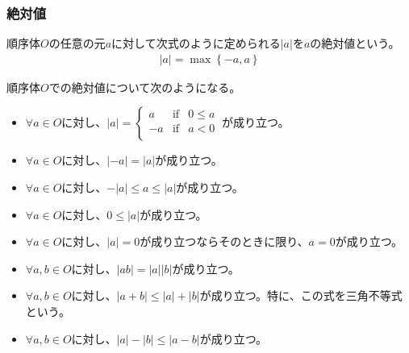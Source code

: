 \documentclass[dvipdfmx]{jsarticle}
\begin{document}
\subsubsection{絶対値}%
\begin{dfn}
順序体$O$の任意の元$a$に対して次式のように定められる$|a|$を$a$の絶対値という。
\begin{align*}
|a| = \max\left\{ - a,a \right\}
\end{align*}
\end{dfn}
\begin{thm}\label{4.1.1.10} 順序体$O$での絶対値について次のようになる。
\begin{itemize}
\item
  $\forall a \in O$に対し、$|a| = \left\{ \begin{matrix}
  a & \mathrm{if} & 0 \leq a \\
   - a & \mathrm{if} & a < 0 \\
  \end{matrix} \right.\ $が成り立つ。
\item
  $\forall a \in O$に対し、$| - a| = |a|$が成り立つ。
\item
  $\forall a \in O$に対し、$- |a| \leq a \leq |a|$が成り立つ。
\item
  $\forall a \in O$に対し、$0 \leq |a|$が成り立つ。
\item
  $\forall a \in O$に対し、$|a| = 0$が成り立つならそのときに限り、$a = 0$が成り立つ。
\item
  $\forall a,b \in O$に対し、$|ab| = |a||b|$が成り立つ。
\item
  $\forall a,b \in O$に対し、$|a + b| \leq |a| + |b|$が成り立つ。特に、この式を三角不等式という。
\item
  $\forall a,b \in O$に対し、$|a| - |b| \leq |a - b|$が成り立つ。
\end{itemize}
\end{thm}
\end{document}
